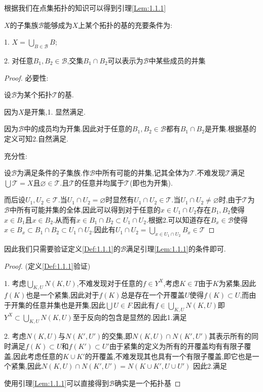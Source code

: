 \documentclass{article}
\begin{document}
根据我们在点集拓扑的知识可以得到引理\ref{Lem:1.1.1}
\begin{lemma}
$X$的子集族$\mathscr{B}$能够成为$X$上某个拓扑的基的充要条件为:


1. $X= \bigcup_{B \in \mathscr{B}} B$;


2. 对任意$B_1,B_2 \in \mathscr{B}$,交集$B_1\cap B_2$可以表示为$\mathscr{B}$中某些成员的并集
\label{Lem:1.1.1}
\end{lemma}
\begin{proof}


必要性:


设$\mathscr{B}$为某个拓扑$\mathscr{T}$的基.


因为$X$是开集,1. 显然满足.


因为$\mathscr{B}$中的成员均为开集.因此对于任意的$B_1,B_2 \in \mathscr{B}$都有$B_1 \cap B_2$是开集.根据基的定义可知2.自然满足.


充分性:


设$\mathscr{B}$为满足条件的子集族.作$\mathscr{B}$中所有可能的并集,记其全体为$\mathscr{T}$.不难发现$\mathscr{T}$满足$\bigcup \mathscr{T} = X$且$\varnothing \in \mathscr{T}$.且$\mathscr{T}$的任意并均属于$\mathscr{T}$(即也为开集).


而后设$U_1,U_2 \in \mathscr{T}$.当$U_1 \cap U_2 = \varnothing$时显然有$U_1 \cap U_2 \in \mathscr{T}$.当$U_1 \cap U_2 \neq \varnothing$时,由于$\mathscr{T}$为$\mathscr{B}$中所有可能并集的全体,因此可以得到对于任意的$x \in U_1 \cap U_2$存在$B_1,B_2$使得$x \in B_1$且$x \in B_2$.从而有$x \in B_1 \cap B_2 \subset U_1 \cap U_2$.根据2.可以知道存在$B_x\in \mathscr{B}$使得$x\in B_x \subset B_1 \cap B_2 \subset U_1 \cap U_2$.因此有$U_1 \cap U_2 = \bigcup_{x \in U_1 \cap U_2}B_x \in \mathscr{T}$
\end{proof}
因此我们只需要验证定义\ref{Def:1.1.1}的$\mathscr{B}$满足引理\ref{Lem:1.1.1}的条件即可.
\begin{proof}
    (定义\ref{Def:1.1.1}验证)


    1. 考虑$\bigcup_{K,U}N(K,U)$,不难发现对于任意的$f \in Y^X$,考虑$K \in T$由于$K$为紧集,因此$f(K)$也是一个紧集,因此对于$f(K)$总是存在一个开覆盖$U$使得$f(K) \subset U$,而由于开集的任意并集也是开集,因此$\bigcup U \in F$.因此有$f \in \bigcup_{K,U}N(K,U)$即$Y^X \subset \bigcup_{K,U}N(K,U)$至于反向的包含是显然的.因此1.满足


    2. 考虑$N(K,U)$与$N(K',U')$的交集,即$N(K,U) \cap N(K',U')$其表示所有的同时满足$f(K) \subset U$和$f(K') \subset U'$由于紧集的定义为所有的开覆盖均有有限子覆盖,因此考虑任意的$K \cup K'$的开覆盖,不难发现其也具有一个有限子覆盖,即它也是一个紧集,因此$N(K,U) \cap N(K',U') = N(K \cup K',U \cup U')$
    因此2.满足


    使用引理\ref{Lem:1.1.1}可以直接得到$\mathscr{B}$确实是一个拓扑基
\end{proof}
\end{document}
